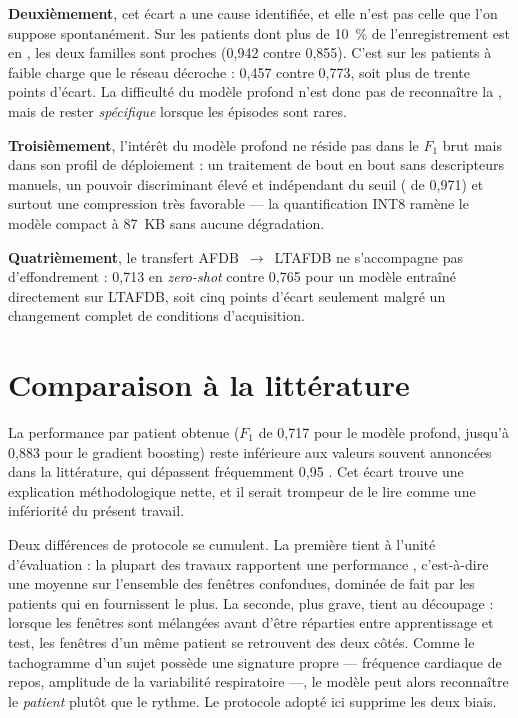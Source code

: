 \textbf{Deuxièmement}, cet écart a une cause identifiée, et elle n'est pas celle que l'on suppose spontanément. Sur les patients dont plus de 10~\% de l'enregistrement est en \FA{}, les deux familles sont proches (0,942 contre 0,855). C'est sur les patients à faible charge que le réseau décroche : 0,457 contre 0,773, soit plus de trente points d'écart. La difficulté du modèle profond n'est donc pas de reconnaître la \FA{}, mais de rester \emph{spécifique} lorsque les épisodes sont rares.

\textbf{Troisièmement}, l'intérêt du modèle profond ne réside pas dans le \(F_1\) brut mais dans son profil de déploiement : un traitement de bout en bout sans descripteurs manuels, un pouvoir discriminant élevé et indépendant du seuil (\AUROC{} de 0,971) et surtout une compression très favorable — la quantification INT8 ramène le modèle compact à 87~KB sans aucune dégradation.

\textbf{Quatrièmement}, le transfert AFDB~$\rightarrow$~LTAFDB ne s'accompagne pas d'effondrement : 0,713 en \textit{zero-shot} contre 0,765 pour un modèle entraîné directement sur LTAFDB, soit cinq points d'écart seulement malgré un changement complet de conditions d'acquisition.

\section{Comparaison à la littérature}
\label{sec:disc:litterature}

La performance par patient obtenue (\(F_1\) de 0,717 pour le modèle profond, jusqu'à 0,883 pour le gradient boosting) reste inférieure aux valeurs souvent annoncées dans la littérature, qui dépassent fréquemment 0,95 \cite{andersen2019deep,hannun2019cardiologist,faust2018automated}. Cet écart trouve une explication méthodologique nette, et il serait trompeur de le lire comme une infériorité du présent travail.

Deux différences de protocole se cumulent. La première tient à l'unité d'évaluation : la plupart des travaux rapportent une performance , c'est-à-dire une moyenne sur l'ensemble des fenêtres confondues, dominée de fait par les patients qui en fournissent le plus. La seconde, plus grave, tient au découpage : lorsque les fenêtres sont mélangées avant d'être réparties entre apprentissage et test, les fenêtres d'un même patient se retrouvent des deux côtés. Comme le tachogramme d'un sujet possède une signature propre — fréquence cardiaque de repos, amplitude de la variabilité respiratoire —, le modèle peut alors reconnaître le \emph{patient} plutôt que le rythme. Le protocole adopté ici supprime les deux biais.

